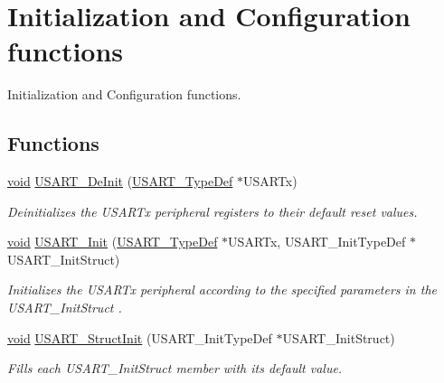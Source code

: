\hypertarget{group___u_s_a_r_t___group1}{\section{Initialization and Configuration functions}
\label{group___u_s_a_r_t___group1}
}


Initialization and Configuration functions.  


\subsection*{Functions}
\begin{DoxyCompactItemize}
\item 
\hyperlink{group___n_a_m_e_ga18028b8badbf1ea7e704ccac3c488e82}{void} \hyperlink{group___u_s_a_r_t___group1_ga2f8e1ce72da21b6539d8e1f299ec3b0d}{U\-S\-A\-R\-T\-\_\-\-De\-Init} (\hyperlink{struct_u_s_a_r_t___type_def}{U\-S\-A\-R\-T\-\_\-\-Type\-Def} $\ast$U\-S\-A\-R\-Tx)
\begin{DoxyCompactList}\small\item\em Deinitializes the U\-S\-A\-R\-Tx peripheral registers to their default reset values. \end{DoxyCompactList}\item 
\hyperlink{group___n_a_m_e_ga18028b8badbf1ea7e704ccac3c488e82}{void} \hyperlink{group___u_s_a_r_t___group1_ga98da340ea0324002ba1b4263e91ab2ff}{U\-S\-A\-R\-T\-\_\-\-Init} (\hyperlink{struct_u_s_a_r_t___type_def}{U\-S\-A\-R\-T\-\_\-\-Type\-Def} $\ast$U\-S\-A\-R\-Tx, U\-S\-A\-R\-T\-\_\-\-Init\-Type\-Def $\ast$U\-S\-A\-R\-T\-\_\-\-Init\-Struct)
\begin{DoxyCompactList}\small\item\em Initializes the U\-S\-A\-R\-Tx peripheral according to the specified parameters in the U\-S\-A\-R\-T\-\_\-\-Init\-Struct . \end{DoxyCompactList}\item 
\hyperlink{group___n_a_m_e_ga18028b8badbf1ea7e704ccac3c488e82}{void} \hyperlink{group___u_s_a_r_t___group1_ga34e1faa2f312496c16cfd05155f4c8b1}{U\-S\-A\-R\-T\-\_\-\-Struct\-Init} (U\-S\-A\-R\-T\-\_\-\-Init\-Type\-Def $\ast$U\-S\-A\-R\-T\-\_\-\-Init\-Struct)
\begin{DoxyCompactList}\small\item\em Fills each U\-S\-A\-R\-T\-\_\-\-Init\-Struct member with its default value. \end{DoxyCompactList}\item 

\end{DoxyCompactItemize}
